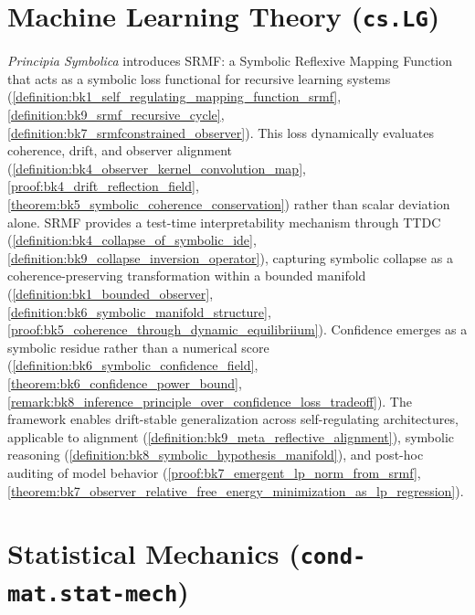 \section*{Machine Learning Theory (\texttt{cs.LG})}
\label{abs:ml}

\emph{Principia Symbolica} introduces SRMF: a Symbolic Reflexive Mapping Function that acts as a symbolic loss functional for recursive learning systems (\ref{definition:bk1_self_regulating_mapping_function_srmf}, \ref{definition:bk9_srmf_recursive_cycle}, \ref{definition:bk7_srmfconstrained_observer}). This loss dynamically evaluates coherence, drift, and observer alignment (\ref{definition:bk4_observer_kernel_convolution_map}, \ref{proof:bk4_drift_reflection_field}, \ref{theorem:bk5_symbolic_coherence_conservation}) rather than scalar deviation alone. SRMF provides a test-time interpretability mechanism through TTDC (\ref{definition:bk4_collapse_of_symbolic_ide}, \ref{definition:bk9_collapse_inversion_operator}), capturing symbolic collapse as a coherence-preserving transformation within a bounded manifold (\ref{definition:bk1_bounded_observer}, \ref{definition:bk6_symbolic_manifold_structure}, \ref{proof:bk5_coherence_through_dynamic_equilibriium}). Confidence emerges as a symbolic residue rather than a numerical score (\ref{definition:bk6_symbolic_confidence_field}, \ref{theorem:bk6_confidence_power_bound}, \ref{remark:bk8_inference_principle_over_confidence_loss_tradeoff}). The framework enables drift-stable generalization across self-regulating architectures, applicable to alignment (\ref{definition:bk9_meta_reflective_alignment}), symbolic reasoning (\ref{definition:bk8_symbolic_hypothesis_manifold}), and post-hoc auditing of model behavior (\ref{proof:bk7_emergent_lp_norm_from_srmf}, \ref{theorem:bk7_observer_relative_free_energy_minimization_as_lp_regression}).

\section*{Statistical Mechanics (\texttt{cond-mat.stat-mech})}
\label{abs:thermo}

